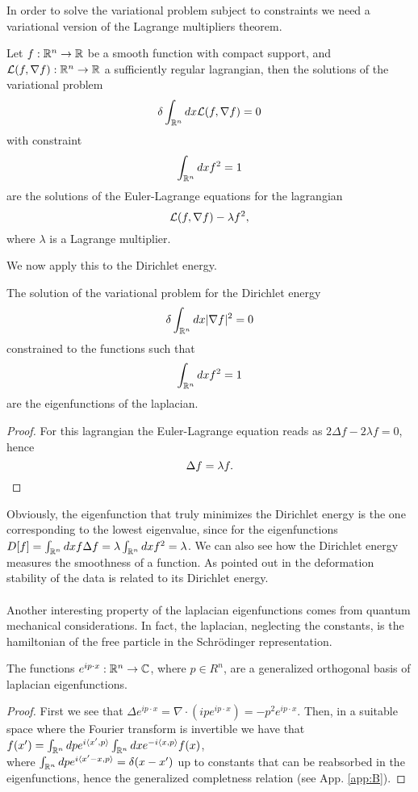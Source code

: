 \documentclass[../2.tex]{subfiles}
\begin{document}
In order to solve the variational problem subject to constraints we need a variational 
version of the Lagrange multipliers theorem.

\begin{prop}
    Let $f:\mathbb{R}^n \to \mathbb{R}$ be a smooth function with compact support, and $\mathcal{L}(f,\nabla f) : \mathbb{R}^n \to \mathbb{R}$ a sufficiently regular lagrangian,
    then the solutions of the variational problem 
    \[ \delta\int_{\mathbb{R}^n} dx \mathcal{L}(f,\nabla f) = 0 \]
    with constraint
    \[ \int_{\mathbb{R}^n} dx f^2 = 1 \]
    are the solutions of the Euler-Lagrange equations for the lagrangian
    \[ \mathcal{L}(f,\nabla f) - \lambda f^2, \]
    where $\lambda$ is a Lagrange multiplier.
\end{prop}

We now apply this to the Dirichlet energy.

\begin{prop}
    The solution of the variational problem for the Dirichlet energy
    \[ \delta\int_{\mathbb{R}^n} dx | \nabla f |^2 = 0 \]
    constrained to the functions such that 
    \[ \int_{\mathbb{R}^n} dx f^2 = 1 \]
    are the eigenfunctions of the laplacian.
\end{prop}
\begin{proof}
    For this lagrangian the Euler-Lagrange equation reads as $ 2 \Delta f - 2\lambda f = 0$,
    hence 
    \[ \Delta f = \lambda f . \qedhere \]

\end{proof}

Obviously, the eigenfunction that truly minimizes the Dirichlet energy is the one corresponding to the lowest eigenvalue,
since for the eigenfunctions $D[f] = \int_{\mathbb{R}^n} dx f \Delta f = \lambda \int_{\mathbb{R}^n} dx f^2 = \lambda$. We can also see how the Dirichlet energy
measures the smoothness of a function. As pointed out in \cite{2021geo} the deformation stability of the data is related to its Dirichlet energy.\\
\hfill \\

Another interesting property of the laplacian eigenfunctions comes from quantum mechanical considerations.
In fact, the laplacian, neglecting the constants, is the hamiltonian of the free particle in the Schr\"{o}dinger representation.

\begin{prop}
    The functions $e^{ip\cdot x} : \mathbb{R}^n \to \mathbb{C}$, where $p \in R^n$, are a generalized orthogonal basis of laplacian eigenfunctions.
\end{prop}
\begin{proof} 
    First we see that $\Delta e^{ip\cdot x} = \nabla \cdot (ipe^{ip\cdot x}) = -p^2 e^{ip\cdot x}$.
    Then, in a suitable space where the Fourier transform is invertible we have that $f(x') = \int_{\mathbb{R}^n} dp e^{i\langle x', p \rangle}\int_{\mathbb{R}^n} dx e^{-i\langle x, p \rangle}f(x)$, 
    \\where $\int_{\mathbb{R}^n} dp e^{i\langle x'-x, p \rangle} = \delta(x-x')$ up to constants that can be reabsorbed in the eigenfunctions, hence the generalized completness relation (see App. \ref{app:B}). \qedhere
\end{proof}
\end{document}
